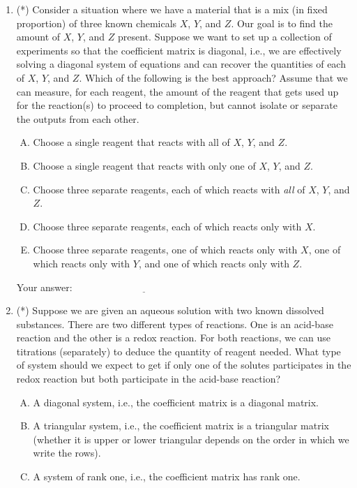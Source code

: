 \documentclass[10pt]{amsart}
\begin{document}
\begin{enumerate}
\item (*) Consider a situation where we have a material that is a mix
  (in fixed proportion) of three known chemicals $X$, $Y$, and
  $Z$. Our goal is to find the amount of $X$, $Y$, and $Z$
  present. Suppose we want to set up a collection of experiments so
  that the coefficient matrix is diagonal, i.e., we are effectively
  solving a diagonal system of equations and can recover the
  quantities of each of $X$, $Y$, and $Z$. Which of the following is
  the best approach?  Assume that we can measure, for each reagent,
  the amount of the reagent that gets used up for the reaction(s) to
  proceed to completion, but cannot isolate or separate the outputs
  from each other.

  \begin{enumerate}[(A)]
  \item Choose a single reagent that reacts with all of $X$, $Y$, and
    $Z$.
  \item Choose a single reagent that reacts with only one of $X$, $Y$,
    and $Z$.
  \item Choose three separate reagents, each of which reacts with {\em
    all} of $X$, $Y$, and $Z$.
  \item Choose three separate reagents, each of which reacts only with
    $X$.
  \item Choose three separate reagents, one of which reacts only with
    $X$, one of which reacts only with $Y$, and one of which reacts
    only with $Z$.
  \end{enumerate}

  \vspace{0.1in}
  Your answer: $\underline{\qquad\qquad\qquad\qquad\qquad\qquad\qquad}$
  \vspace{0.1in}

\item (*) Suppose we are given an aqueous solution with two known
  dissolved substances. There are two different types of
  reactions. One is an acid-base reaction and the other is a redox
  reaction. For both reactions, we can use titrations (separately) to
  deduce the quantity of reagent needed. What type of system should we
  expect to get if only one of the solutes participates in the redox
  reaction but both participate in the acid-base reaction?

  \begin{enumerate}[(A)]
  \item A diagonal system, i.e., the coefficient matrix is a diagonal matrix.
  \item A triangular system, i.e., the coefficient matrix is a
    triangular matrix (whether it is upper or lower triangular depends
    on the order in which we write the rows).
  \item A system of rank one, i.e., the coefficient matrix has rank one.
  \end{enumerate}


\end{enumerate}
\end{document}
